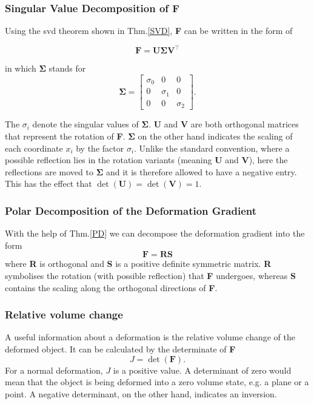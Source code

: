 \subsubsection{Singular Value Decomposition of F}

Using the \acrshort{svd} theorem shown in Thm.\ref{SVD}, \textbf{F} can be written in the form of

\begin{equation}\label{eq:svd_gradient}
\mathbf{F} = \mathbf{U \Sigma V^\intercal}
\end{equation}

in which $\mathbf{\Sigma}$ stands for
\begin{equation}\label{eq:svd_simga}
\mathbf{\Sigma} = \left[\begin{matrix}  \sigma_0 & 0 & 0 \\ 0 & \sigma_1 & 0 \\ 0 & 0 & \sigma_2 \end{matrix}\right] .
\end{equation}

The $\sigma_i$ denote the singular values of $\mathbf{\Sigma}$.
\textbf{U} and $\mathbf{V}$ are both orthogonal matrices that represent the rotation of \textbf{F}. $\mathbf{\Sigma}$ on the other hand indicates the scaling of each coordinate $x_i$ by the factor $\sigma_i$. Unlike the standard convention, where a possible reflection lies in the rotation variants (meaning \textbf{U} and \textbf{V}), here the reflections are moved to $\mathbf{\Sigma}$ and it is therefore allowed to have a negative entry. This has the effect that $\operatorname{det}(\mathbf{U}) = \operatorname{det}(\mathbf{V}) =1$.


\subsubsection{Polar Decomposition of the Deformation Gradient}
With the help of Thm.\ref{PD} we can decompose the deformation gradient into the form
\begin{equation}\label{PD_DG}
	\mathbf{F} = \mathbf{RS}
\end{equation}
where \textbf{R} is orthogonal and \textbf{S} is a positive definite symmetric matrix. \textbf{R} symbolises the rotation (with possible reflection) that \textbf{F} undergoes, whereas \textbf{S} contains the scaling along the orthogonal directions of \textbf{F}.

\subsubsection{Relative volume change}
A useful information about a deformation is the relative volume change of the deformed object. It can be calculated by the determinate of \textbf{F}
\begin{equation}\label{det_DG}
	J = \operatorname{det}(\mathbf{F}).
\end{equation}
For a normal deformation, $J$ is a positive value. A determinant of zero would mean that the object is being deformed into a zero volume state, e.g. a plane or a point. A negative determinant, on the other hand, indicates an inversion.


